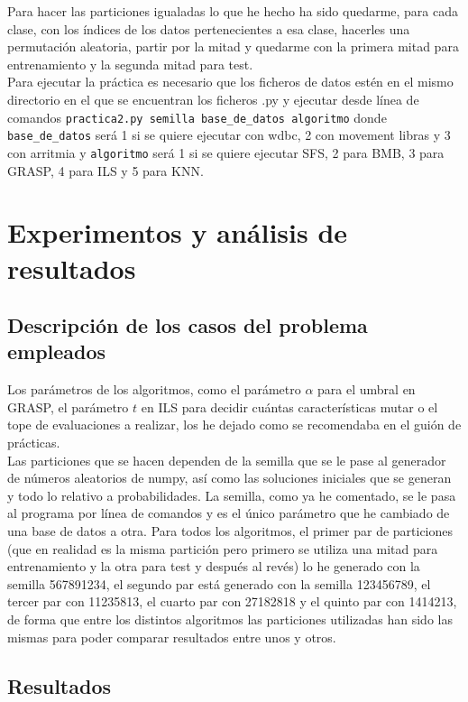 \documentclass[12pt]{article}
\begin{document}
Para hacer las particiones igualadas lo que he hecho ha sido quedarme, para cada clase, con los índices de los datos pertenecientes a esa clase, hacerles una permutación aleatoria, partir por la mitad y quedarme con la primera mitad para entrenamiento y la segunda mitad para test.\\

Para ejecutar la práctica es necesario que los ficheros de datos estén en el mismo directorio en el que se encuentran los ficheros .py y ejecutar desde línea de comandos \texttt{practica2.py semilla base\_de\_datos algoritmo} donde \texttt{base\_de\_datos} será 1 si se quiere ejecutar con wdbc, 2 con movement libras y 3 con arritmia y \texttt{algoritmo} será 1 si se quiere ejecutar SFS, 2 para BMB, 3 para GRASP, 4 para ILS y 5 para KNN.

\newpage

\section{Experimentos y análisis de resultados}
\subsection{Descripción de los casos del problema empleados}

Los parámetros de los algoritmos, como el parámetro $\alpha$ para el umbral en GRASP, el parámetro $t$ en ILS para decidir cuántas características mutar o el tope de evaluaciones a realizar, los he dejado como se recomendaba en el guión de prácticas.\\
Las particiones que se hacen dependen de la semilla que se le pase al generador de números aleatorios de numpy, así como las soluciones iniciales que se generan y todo lo relativo a probabilidades. La semilla, como ya he comentado, se le pasa al programa por línea de comandos y es el único parámetro que he cambiado de una base de datos a otra. Para todos los algoritmos, el primer par de particiones (que en realidad es la misma partición pero primero se utiliza una mitad para entrenamiento y la otra para test y después al revés) lo he generado con la semilla 567891234, el segundo par está generado con la semilla 123456789, el tercer par con 11235813, el cuarto par con 27182818 y el quinto par con 1414213, de forma que entre los distintos algoritmos las particiones utilizadas han sido las mismas para poder comparar resultados entre unos y otros.

\subsection{Resultados}
\end{document}

